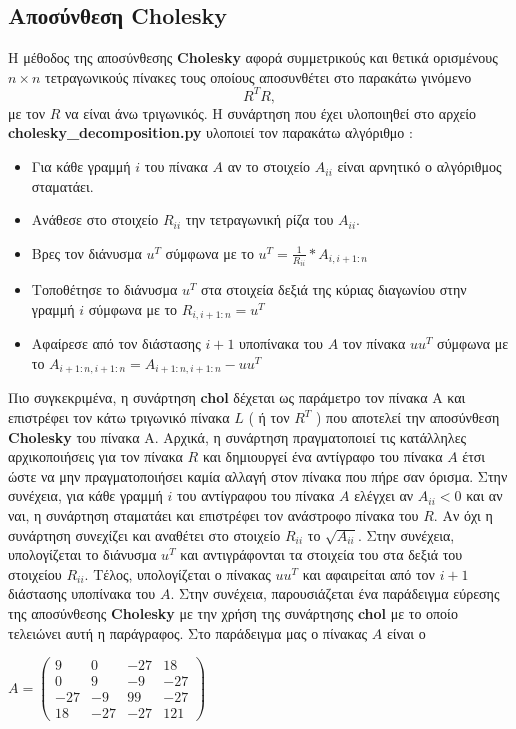 \documentclass[First Project.tex]{subfiles}
\begin{document}
\subsection{ Αποσύνθεση \textlatin{\textbf{Cholesky}} }

Η μέθοδος της αποσύνθεσης \textlatin{\textbf{Cholesky}} αφορά συμμετρικούς και θετικά ορισμένους $n \times n$ τετραγωνικούς πίνακες τους 
οποίους αποσυνθέτει στο παρακάτω γινόμενο 
\begin{equation*}
    R^{T}R , 
\end{equation*}
με τον $R$ να είναι άνω τριγωνικός. Η συνάρτηση που έχει υλοποιηθεί στο αρχείο \textlatin{\textbf{cholesky\_decomposition.py}} υλοποιεί τον 
παρακάτω αλγόριθμο :
\begin{itemize}
    \item Για κάθε γραμμή $i$ του πίνακα $Α$ αν το στοιχείο $A_{ii}$ είναι αρνητικό ο αλγόριθμος σταματάει.
    \item Ανάθεσε στο στοιχείο $R_{ii}$ την τετραγωνική ρίζα του $A_{ii}$.
    \item Βρες τον διάνυσμα $u^{T}$ σύμφωνα με το $u^{T} = \frac{1}{R_{ii}} * A_{i,i+1:n}$
    \item Τοποθέτησε το διάνυσμα $u^{T}$ στα στοιχεία δεξιά της κύριας διαγωνίου στην γραμμή $i$ σύμφωνα με το $R_{i,i+1:n} = u^{T}$  
    \item Αφαίρεσε από τον διάστασης $i+1$ υποπίνακα του $Α$ τον πίνακα $uu^{T}$ σύμφωνα με το $A_{i+1:n,i+1:n} = A_{i+1:n,i+1:n} -uu^{T}$ 
\end{itemize}

Πιο συγκεκριμένα, η συνάρτηση \textlatin{\textbf{chol}} δέχεται ως παράμετρο τον πίνακα \textlatin{A} και επιστρέφει τον κάτω τριγωνικό πίνακα
$L$ ( ή τον $R^{T}$ ) που αποτελεί την αποσύνθεση \textlatin{\textbf{Cholesky}} του πίνακα \textlatin{A}. Αρχικά, η συνάρτηση πραγματοποιεί 
τις κατάλληλες αρχικοποιήσεις για τον πίνακα $R$ και δημιουργεί ένα αντίγραφο του πίνακα $A$ έτσι ώστε να μην πραγματοποιήσει
καμία αλλαγή στον πίνακα που πήρε σαν όρισμα. Στην συνέχεια, για κάθε γραμμή $i$ του αντίγραφου του πίνακα $A$ ελέγχει αν $A_{ii} < 0 $ και αν
ναι, η συνάρτηση σταματάει και επιστρέφει τον ανάστροφο πίνακα του $R$. Αν όχι η συνάρτηση συνεχίζει και αναθέτει στο στοιχείο $R_{ii}$ το
$\sqrt{A_{ii}}$. Στην συνέχεια, υπολογίζεται το διάνυσμα $u^{Τ}$ και αντιγράφονται τα στοιχεία του στα δεξιά του στοιχείου $R_{ii}$. Τέλος, 
υπολογίζεται ο πίνακας $uu^{T}$ και αφαιρείται από τον $i+1$ διάστασης υποπίνακα του $Α$. Στην συνέχεια, παρουσιάζεται ένα παράδειγμα εύρεσης
της αποσύνθεσης \textlatin{\textbf{Cholesky}} με την χρήση της συνάρτησης \textlatin{\textbf{chol}} με το οποίο τελειώνει αυτή η παράγραφος.
Στο παράδειγμα μας ο πίνακας $Α$ είναι ο  
\begin{center}
$A = \begin{pmatrix}
9 & 0 & -27 & 18 \\
0 & 9 & -9 & -27 \\
-27 & -9 & 99 & -27 \\
18 & -27 & -27 & 121
\end{pmatrix}$
\end{center}
\end{document}
